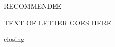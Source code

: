 \documentclass[11pt,recommendation,sign]{university_recommendation}
\begin{document}
\signature{MYNAME, Professor of MYFIELD\\\url{MY EMAIL ADDRESS}}

\begin{letter}{RECOMMENDEE}
\opening{}

TEXT OF LETTER GOES HERE

closing
\end{letter}

		
\end{document}
